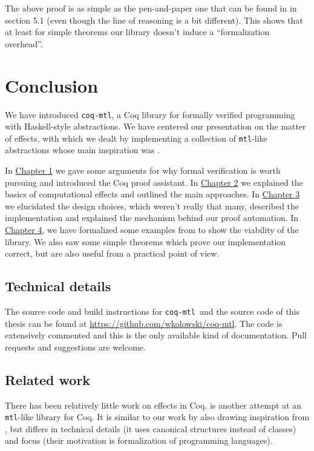 \documentclass[declaration,inz,english,shortabstract]{iithesis}
\newcommand{\libname}{\m{coq-mtl}}
\newcommand{\homepage}{\url{https://github.com/wkolowski/coq-mtl}}
\newcommand{\m}[1]{\texttt{#1}}
\begin{document}
The above proof is as simple as the pen-and-paper one that can be found in \cite{JustDoIt} in section 5.1 (even though the line of reasoning is a bit different). This shows that at least for simple theorems our library doesn't induce a ``formalization overhead''.

\chapter{Conclusion} \label{ch5}

We have introduced \libname, a Coq library for formally verified programming with Haskell-style abstractions. We have centered our presentation on the matter of effects, with which we dealt by implementing a collection of \m{mtl}-like abstractions whose main inspiration was \cite{JustDoIt}.

In \hyperref[ch1]{Chapter 1} we gave some arguments for why formal verification is worth pursuing and introduced the Coq proof assistant. In \hyperref[ch2]{Chapter 2} we explained the basics of computational effects and outlined the main approaches. In \hyperref[ch3]{Chapter 3} we elucidated the design choices, which weren't really that many, described the implementation and explained the mechanism behind our proof automation. In \hyperref[ch4]{Chapter 4}, we have formalized some examples from \cite{JustDoIt} to show the viability of the library. We also saw some simple theorems which prove our implementation correct, but are also useful from a practical point of view.

\section{Technical details}

The source code and build instructions for \libname\ and the source code of this thesis can be found at \homepage. The code is extensively commented and this is the only available kind of documentation. Pull requests and suggestions are welcome.

\section{Related work}

There has been relatively little work on effects in Coq. \cite{MERC} is another attempt at an \m{mtl}-like library for Coq. It is similar to our work by also drawing inspiration from \cite{JustDoIt}, but differs in technical details (it uses canonical structures instead of classes) and focus (their motivation is formalization of programming languages).
\end{document}
